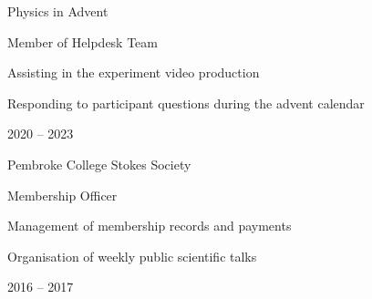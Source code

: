 



\begin{cvhonors}
  \cvhonor
    {Physics in Advent} %
    {%
      Member of Helpdesk Team\newline~
      \begin{cvitems}
        \item {Assisting in the experiment video production}
        \item {Responding to participant questions during the advent calendar}
      \end{cvitems}
    } %
    {} %
    {2020 -- 2023} %

  \cvhonor
    {Pembroke College Stokes Society} %
    {%
      Membership Officer\newline~
      \begin{cvitems}
        \item {Management of membership records and payments}
        \item {Organisation of weekly public scientific talks}
      \end{cvitems}
    } %
    {} %
    {2016 -- 2017} %

\end{cvhonors}



